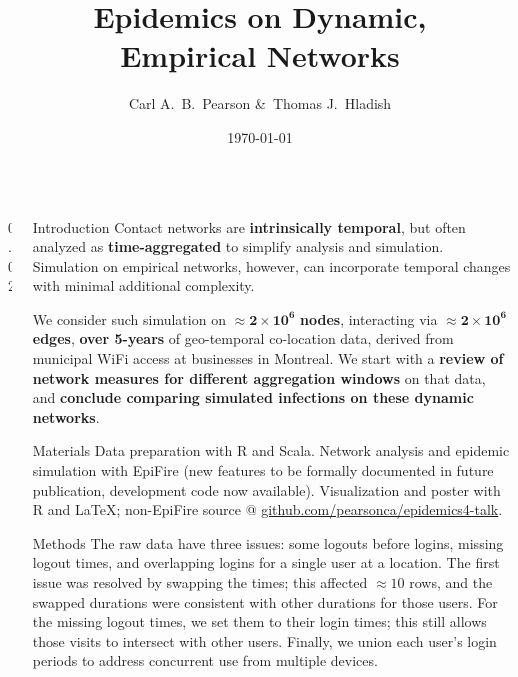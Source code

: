\documentclass[final]{beamer} %
\title[Epi. on Emp. Nets]{Epidemics on Dynamic,\\ Empirical Networks}
\author[Pearson \& Hladish]{Carl A.~B.~Pearson \&\ Thomas J.~Hladish}
\institute[EPI-UF]{Emerging Pathogens Institute, University of Florida}
\date{\today}
\newcommand{\spaceProp}{0.02}
\newcommand{\spacer}{\begin{column}{\spaceProp\paperwidth}\end{column}}
\newenvironment{oneCol}{\begin{column}[t]{0.225\paperwidth}}{\end{column}}
\begin{document}

  \begin{frame}{}
    \begin{columns}[t]
    \spacer{}
    \begin{oneCol}
    \begin{block}{Introduction}
Contact networks are \textbf{intrinsically temporal}, but often analyzed as \textbf{time-aggregated} to simplify analysis and simulation.  Simulation on empirical networks, however, can incorporate temporal changes with minimal additional complexity.

We consider such simulation on $\mathbf{\approx 2\times 10^6}$\textbf{ nodes}, interacting via $\mathbf{\approx 2\times 10^6}$\textbf{ edges}, \textbf{over 5-years} of geo-temporal co-location data, derived from municipal WiFi access at businesses in Montreal\cite{hoen2013montreal}.  We start with a \textbf{review of network measures for different aggregation windows} on that data, and \textbf{conclude comparing simulated infections on these dynamic networks}.
    \end{block}
    \begin{block}{Materials}
Data preparation with R and Scala.  Network analysis and epidemic simulation with EpiFire\cite{hladish2012epifire} (new features to be formally documented in future publication, development code now available).  Visualization and poster with R and \LaTeX; non-EpiFire source @ \href{https://github.com/pearsonca/epidemics4-talk}{github.com/pearsonca/epidemics4-talk}.
    \end{block}
    \begin{block}{Methods}
The raw data have three issues: some logouts before logins, missing logout times, and overlapping logins for a single user at a location.  The first issue was resolved by swapping the times; this affected $\approx 10$ rows, and the swapped durations were consistent with other durations for those users.  For the missing logout times, we set them to their login times; this still allows those visits to intersect with other users.  Finally, we union each user's login periods to address concurrent use from multiple devices.


\end{block}
\end{oneCol}
\end{columns}
\end{frame}
\end{document}
